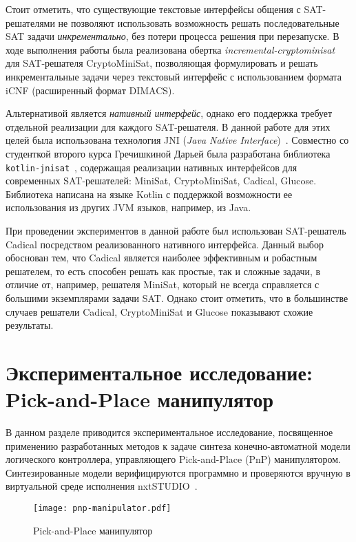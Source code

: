 Стоит отметить, что существующие текстовые интерфейсы общения с SAT-решателями не позволяют использовать возможность решать последовательные SAT задачи \emph{инкрементально}, без потери процесса решения при перезапуске.
В ходе выполнения работы была реализована обертка \textit{incremental-cryptominisat}~\cite{incremental-cryptominisat} для SAT-решателя CryptoMiniSat, позволяющая формулировать и решать инкрементальные задачи через текстовый интерфейс с использованием формата iCNF (расширенный формат DIMACS).

Альтернативой является \emph{нативный интерфейс}, однако его поддержка требует отдельной реализации для каждого SAT-решателя.
В данной работе для этих целей была использована технология JNI (\textit{Java Native Interface})~\cite{jni}.
Совместно со студенткой второго курса Гречишкиной Дарьей была разработана библиотека \texttt{kotlin-jnisat}~\cite{kotlin-jnisat,kmu20-jnisat}, содержащая реализации нативных интерфейсов для современных SAT-решателей: MiniSat, CryptoMiniSat, Cadical, Glucose.
Библиотека написана на языке Kotlin с поддержкой возможности ее использования из других JVM языков, например, из Java.

При проведении экспериментов в данной работе был использован SAT-решатель Cadical посредством реализованного нативного интерфейса.
Данный выбор обоснован тем, что Cadical является наиболее эффективным и робастным решателем, то есть способен решать как простые, так и сложные задачи, в отличие от, например, решателя MiniSat, который не всегда справляется с большими экземплярами задачи SAT\@.
Однако стоит отметить, что в большинстве случаев решатели Cadical, CryptoMiniSat и Glucose показывают схожие результаты.


\section{Экспериментальное исследование: Pick-and-Place манипулятор}%
\label{sec:experiments-monolith-pnp}

В данном разделе приводится экспериментальное исследование, \allowbreak посвященное применению разработанных методов к задаче синтеза конечно-автоматной модели логического контроллера, управляющего Pick-and-Place (PnP) манипулятором.
Синтезированные модели верифицируются программно и проверяются вручную в виртуальной среде исполнения nxtSTUDIO~\cite{nxtstudio}.

\begin{figure}[htb]
    \centering
    \texttt{[image: pnp-manipulator.pdf]}
    \caption{Pick-and-Place манипулятор}%
    \label{fig:pnp-manipulator}
\end{figure}

